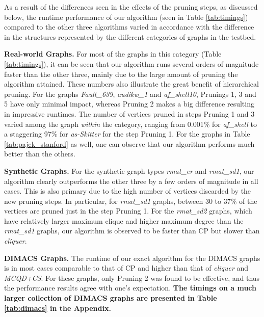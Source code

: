 As a result  of the differences seen in the effects of the pruning steps, as discussed below,
the runtime performance of our algorithm (seen in Table \ref{tab:timings}) compared
to the other three algorithms varied in accordance with the difference in the structures represented 
by the different categories of graphs in the testbed.

{\bf Real-world Graphs. }
For most of the graphs in this category (Table \ref{tab:timings}), it can be seen that our algorithm runs several orders of magnitude faster than the other three, mainly due to the large amount of pruning the algorithm attained. These numbers also illustrate the great benefit of hierarchical pruning. 
For the graphs {\em Fault\_639}, {\em audikw\_1} and {\em af\_shell10}, 
Prunings 1, 3 and 5 have only minimal impact,
whereas Pruning 2 makes a big difference resulting in impressive runtimes. 
The number of vertices pruned in steps Pruning 1 and 3 varied among the 
graph {\em within} the
category, ranging from 0.001\% for {\it af\_shell} to a staggering 97\% for {\it as-Skitter} 
for the step Pruning 1. For the graphs in Table \ref{tab:pajek_stanford} as well, one can observe that our algorithm performs much better than the others.



{\bf Synthetic Graphs. }
For the synthetic graph types {\it rmat\_er} and {\it rmat\_sd1}, our algorithm clearly outperforms 
the other three by a few orders of magnitude in all cases. 
This is also primary due to the high number of vertices discarded by the new pruning steps. 
In particular, for {\it rmat\_sd1} graphs, between 30 to 37\% of the vertices are pruned just in the step Pruning 1. 
For the {\it rmat\_sd2} graphs, which have relatively larger maximum clique and higher maximum degree than the {\it rmat\_sd1} graphs, our algorithm is observed to be faster than 
CP but slower than {\em cliquer}. 

{\bf DIMACS Graphs. }
The runtime of our exact algorithm for the DIMACS graphs is 
in most cases comparable to that of CP and higher than that of {\it cliquer}
and {\it MCQD+CS}. 
For these graphs, only Pruning 2 was found to be effective, 
and thus the performance results agree with one's expectation. 
{\bf The timings on a much larger collection of DIMACS graphs are presented in Table \ref{tab:dimacs} in the Appendix.}


